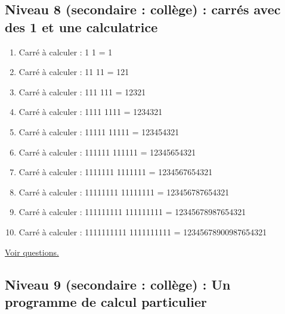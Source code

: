 \documentclass[11pt]{article}
\begin{document}
\newpage


\subsection{Niveau 8 (secondaire : collège) : carrés avec des 1 et une calculatrice}
\label{sec:orgb53deb9}

\label{org7ee15c1}


\begin{enumerate}
\item Carré à calculer : 1 \texttimes{} 1 =  1
\item Carré à calculer : 11 \texttimes{} 11 = 121
\item Carré à calculer : 111 \texttimes{} 111 = 12321
\item Carré à calculer : 1111 \texttimes{} 1111 = 1234321
\item Carré à calculer : 11111 \texttimes{} 11111 = 123454321
\item Carré à calculer : 111111 \texttimes{} 111111 = 12345654321
\item Carré à calculer : 1111111 \texttimes{} 1111111 = 1234567654321
\item Carré à calculer : 11111111 \texttimes{} 11111111 = 123456787654321
\item Carré à calculer : 111111111 \texttimes{} 111111111 = 12345678987654321
\item Carré à calculer : 1111111111 \texttimes{} 1111111111 = 12345678900987654321
\end{enumerate}



\hyperref[org400e461]{Voir questions.}

\newpage


\subsection{Niveau 9 (secondaire : collège) : Un programme de calcul particulier}
\label{sec:org709dc52}

\label{org340dc2e}
\end{document}
